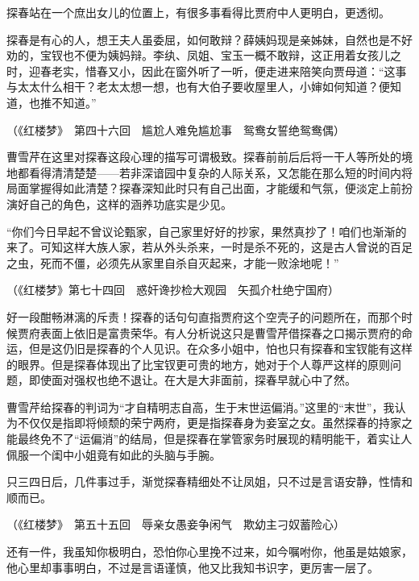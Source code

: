 \documentclass[openany,scheme = chinese, linespread = 1.5]{ctexbook}
\begin{document}
探春站在一个庶出女儿的位置上，有很多事看得比贾府中人更明白，更透彻。


探春是有心的人，想王夫人虽委屈，如何敢辩？薛姨妈现是亲姊妹，自然也是不好劝的，宝钗也不便为姨妈辩。李纨、凤姐、宝玉一概不敢辩，这正用着女孩儿之时，迎春老实，惜春又小，因此在窗外听了一听，便走进来陪笑向贾母道：“这事与太太什么相干？老太太想一想，也有大伯子要收屋里人，小婶如何知道？便知道，也推不知道。”

\begin{center}
（《红楼梦》　第四十六回　尴尬人难免尴尬事　鸳鸯女誓绝鸳鸯偶）
\end{center}

曹雪芹在这里对探春这段心理的描写可谓极致。探春前前后后将一干人等所处的境地都看得清清楚楚——若非深谙园中复杂的人际关系，又怎能在那么短的时间内将局面掌握得如此清楚？探春深知此时只有自己出面，才能缓和气氛，便淡定上前扮演好自己的角色，这样的涵养功底实是少见。


“你们今日早起不曾议论甄家，自己家里好好的抄家，果然真抄了！咱们也渐渐的来了。可知这样大族人家，若从外头杀来，一时是杀不死的，这是古人曾说的百足之虫，死而不僵，必须先从家里自杀自灭起来，才能一败涂地呢！”

\begin{center}
（《红楼梦》第七十四回　惑奸谗抄检大观园　矢孤介杜绝宁国府）

\end{center}

好一段酣畅淋漓的斥责！探春的话句句直指贾府这个空壳子的问题所在，而那个时候贾府表面上依旧是富贵荣华。有人分析说这只是曹雪芹借探春之口揭示贾府的命运，但是这仍旧是探春的个人见识。在众多小姐中，怕也只有探春和宝钗能有这样的眼界。但是探春体现出了比宝钗更可贵的地方，她对于个人尊严这样的原则问题，即使面对强权也绝不退让。在大是大非面前，探春早就心中了然。

曹雪芹给探春的判词为“才自精明志自高，生于末世运偏消。”这里的“末世”，我认为不仅仅是指即将倾颓的荣宁两府，更是指探春身为妾室之女。虽然探春的持家之能最终免不了“运偏消”的结局，但是探春在掌管家务时展现的精明能干，着实让人佩服一个闺中小姐竟有如此的头脑与手腕。

只三四日后，几件事过手，渐觉探春精细处不让凤姐，只不过是言语安静，性情和顺而已。

\begin{center}
（《红楼梦》　第五十五回　辱亲女愚妾争闲气　欺幼主刁奴蓄险心）
\end{center}

还有一件，我虽知你极明白，恐怕你心里挽不过来，如今嘱咐你，他虽是姑娘家，他心里却事事明白，不过是言语谨慎，他又比我知书识字，更厉害一层了。
\end{document}
